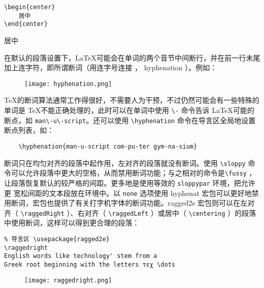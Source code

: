 \begin{minipage}[t]{0.45\textwidth}
\begin{lstlisting}
\begin{center}
    居中
\end{center}
\end{lstlisting}
\end{minipage}
\hfill
\begin{minipage}[t]{0.45\textwidth}
    \begin{center}
        居中
    \end{center}
\end{minipage}

在默认的段落设置下，\LaTeX 可能会在单词的两个音节中间断行，并在前一行未尾加上连字符，即所谓断词（用连字号连接 ， hyphenation ）。例如：
\begin{figure}[H]
    \centering
    \texttt{[image: hyphenation.png]}
\end{figure}

\TeX 的断词算法通常工作得很好，不需要人为干预，不过仍然可能会有一些特殊的单词是 \TeX 不能正确处理的，此时可以在单词中使用 \verb|\-| 命令告诉 \LaTeX 可能的断点，如 \verb|man\-u\-script|。还可以使用 \verb|\hyphenation| 命令在导言区全局地设置断点列表，如：

\begin{lstlisting}
    \hyphenation{man-u-script com-pu-ter gym-na-sium}
\end{lstlisting}

断词只在均匀对齐的段落中起作用，左对齐的段落就没有断词。使用 \verb|\sloppy| 命令可以允许段落中更大的空格，从而禁用断词功能；与之相对的命令是\verb|\fussy| ，让段落恢复默认的较严格的间距。更多地是使用等效的 \verb|sloppypar| 环境，把允许更
宽松间距的文本段放在环境中。以 \verb|none| 选项使用 hyphenat 宏包可以更好地禁用断词，宏包也提供了有关打字机字体的断词功能。ragged2e 宏包则可以在左对齐（ \verb|\raggedRight| ）、右对齐（ \verb|\raggedLeft| ）或居中（ \verb|\centering| ）的段落中使用断词，这样可以得到更合理的段落：

\begin{minipage}[t]{0.7\textwidth}
\begin{lstlisting}
% 导言区 \usepackage{ragged2e}
\raggedright
English words like technology' stem from a
Greek root beginning with the letters τεχ \dots
\end{lstlisting}
\end{minipage}
\hfill
\begin{minipage}[t]{0.15\textwidth}
    \begin{figure}[H]
        \centering
        \texttt{[image: raggedright.png]}
    \end{figure}
\end{minipage}

